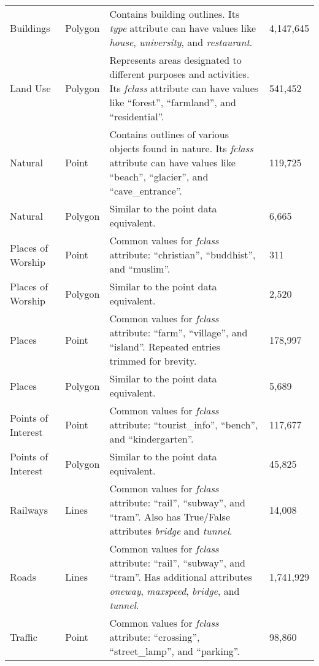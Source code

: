 \begin{longtable}{p{3cm}p{2cm}p{5.7cm}p{2.5cm}}
    Buildings          & Polygon       & Contains building outlines. Its \emph{type} attribute can have values like \emph{house}, \emph{university}, and \emph{restaurant}. & 4,147,645 \\
    Land Use           & Polygon       & Represents areas designated to different purposes and activities. Its \emph{fclass} attribute can have values like \enquote{forest}, \enquote{farmland}, and \enquote{residential}. & 541,452 \\
    Natural            & Point         & Contains outlines of various objects found in nature. Its \emph{fclass} attribute can have values like \enquote{beach}, \enquote{glacier}, and \enquote{cave\_entrance}. & 119,725 \\
    Natural            & Polygon       & Similar to the point data equivalent. & 6,665 \\
    Places of Worship  & Point         & Common values for \emph{fclass} attribute: \enquote{christian}, \enquote{buddhist}, and \enquote{muslim}. & 311 \\
    Places of Worship  & Polygon       & Similar to the point data equivalent. & 2,520 \\
    Places             & Point         & Common values for \emph{fclass} attribute: \enquote{farm}, \enquote{village}, and \enquote{island}. Repeated entries trimmed for brevity. & 178,997 \\
    Places             & Polygon       & Similar to the point data equivalent. & 5,689 \\
    Points of Interest & Point         & Common values for \emph{fclass} attribute: \enquote{tourist\_info}, \enquote{bench}, and \enquote{kindergarten}. & 117,677 \\
    Points of Interest & Polygon       & Similar to the point data equivalent. & 45,825 \\
    Railways           & Lines         & Common values for \emph{fclass} attribute: \enquote{rail}, \enquote{subway}, and \enquote{tram}. Also has True/False attributes \emph{bridge} and \emph{tunnel}. & 14,008 \\
    Roads              & Lines         & Common values for \emph{fclass} attribute: \enquote{rail}, \enquote{subway}, and \enquote{tram}. Has additional attributes \emph{oneway}, \emph{maxspeed}, \emph{bridge}, and \emph{tunnel}. & 1,741,929 \\
    Traffic            & Point         & Common values for \emph{fclass} attribute: \enquote{crossing}, \enquote{street\_lamp}, and \enquote{parking}. & 98,860 \\

\end{longtable}
